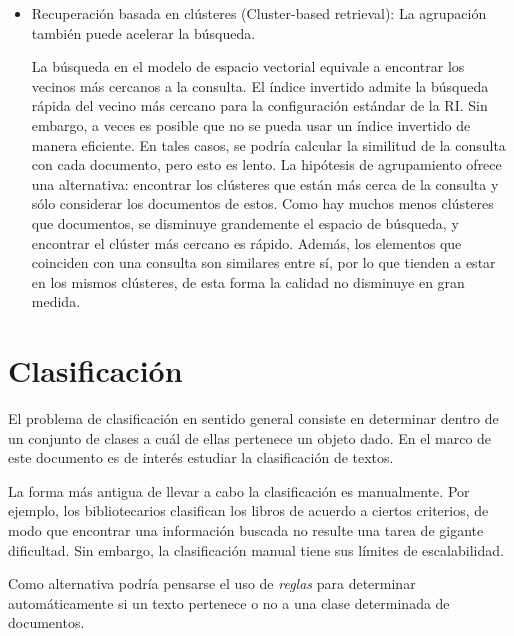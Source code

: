 \documentclass{llncs}
\begin{document}
\begin{itemize}
	\item Recuperaci\'on basada en cl\'usteres (Cluster-based retrieval): La agrupación también puede acelerar la búsqueda. 
	
	La búsqueda en el modelo de espacio vectorial equivale a encontrar los vecinos más cercanos a la consulta. El índice invertido admite la búsqueda rápida del vecino más cercano para la configuración estándar de la RI. Sin embargo, a veces es posible que no se pueda usar un índice invertido de manera eficiente. En tales casos, se podr\'ia calcular la similitud de la consulta con cada documento, pero esto es lento. La hipótesis de agrupamiento ofrece una alternativa: encontrar los cl\'usteres que están más cerca de la consulta y sólo considerar los documentos de estos. Como hay muchos menos clústeres que documentos, se disminuye grandemente el espacio de b\'usqueda, y encontrar el clúster más cercano es rápido. Adem\'as, los elementos que coinciden con una consulta son similares entre sí, por lo que tienden a estar en los mismos cl\'usteres, de esta forma la calidad no disminuye en gran medida.
\end{itemize}

\section{Clasificaci\'on}

	El problema de clasificaci\'on en sentido general consiste en determinar dentro de un conjunto de clases a cu\'al de ellas pertenece un objeto dado. En el marco de este documento es de inter\'es estudiar la clasificaci\'on de textos. 
	
%	
	La forma m\'as antigua de llevar a cabo la clasificaci\'on es manualmente. Por ejemplo, los bibliotecarios clasifican los libros de acuerdo a ciertos criterios, de modo que encontrar una informaci\'on buscada no resulte una tarea de gigante dificultad. Sin embargo, la clasificaci\'on manual tiene sus l\'imites de escalabilidad. 
	
	Como alternativa podr\'ia pensarse el uso de \emph{reglas} para determinar autom\'aticamente si un texto pertenece o no a una clase determinada de documentos.
	
\end{document}
